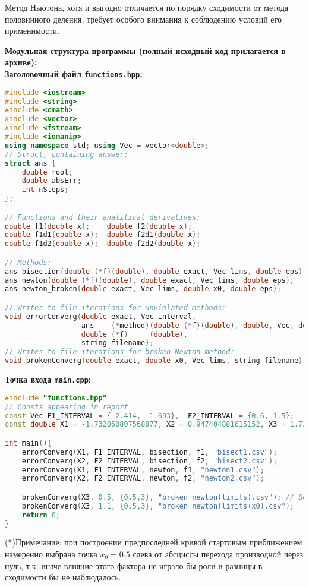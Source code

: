 Метод Ньютона, хотя и выгодно отличается по порядку сходимости от метода половинного деления, требует особого внимания к соблюдению условий его применимости.

\newpage

{\large\bf{Модульная структура программы (полный исходный код прилагается в архиве):}}\\
{\bf Заголовочный файл \texttt{functions.hpp}:}
\begin{lstlisting}[language=c++]
#include <iostream>
#include <string>
#include <cmath>
#include <vector>
#include <fstream>
#include <iomanip>
using namespace std; using Vec = vector<double>;
// Struct, containing answer:
struct ans {
    double root;
    double absErr;
    int nSteps;
};

// Functions and their analitical derivatives:
double f1(double x);    double f2(double x);
double f1d1(double x);  double f2d1(double x);
double f1d2(double x);  double f2d2(double x);

// Methods:
ans bisection(double (*f)(double), double exact, Vec lims, double eps);
ans newton(double (*f)(double), double exact, Vec lims, double eps);
ans newton_broken(double exact, Vec lims, double x0, double eps);

// Writes to file iterations for unviolated methods:
void errorConverg(double exact, Vec interval,
                  ans    (*method)(double (*f)(double), double, Vec, double),
                  double (*f)     (double),
                  string filename);
// Writes to file iterations for broken Newton method:
void brokenConverg(double exact, double x0, Vec lims, string filename);
\end{lstlisting}
{\bf Точка входа \texttt{main.cpp}:}
\begin{lstlisting}[language=c++]
#include "functions.hpp"
// Consts appearing in report
const Vec F1_INTERVAL = {-2.414, -1.693},  F2_INTERVAL = {0.6, 1.5};
const double X1 = -1.732050807568877, X2 = 0.947404881615152, X3 = 1.732050807568877;

int main(){
    errorConverg(X1, F1_INTERVAL, bisection, f1, "bisect1.csv");
    errorConverg(X2, F2_INTERVAL, bisection, f2, "bisect2.csv");
    errorConverg(X1, F1_INTERVAL, newton, f1, "newton1.csv");
    errorConverg(X2, F2_INTERVAL, newton, f2, "newton2.csv");

    brokenConverg(X3, 0.5, {0.5,3}, "broken_newton(limits).csv"); // See (*) below
    brokenConverg(X3, 1.1, {0.5,3}, "broken_newton(limits+x0).csv");
    return 0;
}
\end{lstlisting}
{\tiny (*)Примечание: при построении предпоследней кривой стартовым приближением намеренно выбрана точка $x_0=0.5$ слева от абсциссы перехода производной через нуль, т.к. иначе влияние этого фактора не играло бы роли и разницы в сходимости бы не наблюдалось. }

